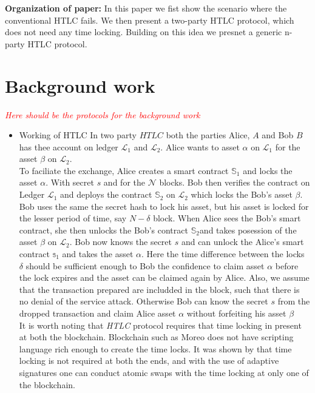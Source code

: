 \documentclass[manuscript,screen,review]{acmart}
\newcommand{\com}[1]{\textcolor{red}{\textit{#1}}}
\begin{document}
\textbf{Organization of paper:} In this paper we fist show the scenario where the conventional HTLC fails. We then present a two-party HTLC protocol, which does not need any time locking. Building on this idea we presnet a generic n-party HTLC protocol. 
\section{Background work}
\com{Here should be the protocols for the background work}
\begin{itemize}
	\item Working of HTLC
	In two party $HTLC$ both the parties Alice, $A$ and Bob $B$ has thee account on ledger $\mathcal{L}_1$ and $\mathcal{L}_2$. Alice wants to asset $\alpha$ on $\mathcal{L}_1$ for the asset $\beta$ on $\mathcal{L}_2$. \\
	To faciliate the exchange, Alice creates a smart contract $\mathbb{S}_1$ and locks the asset $\alpha$. With secret $s$ and for the $\mathcal{N}$ blocks. Bob then verifies the contract on Ledger $\mathcal{L}_1$ and deploys the contract $\mathbb{S}_2$ on $\mathcal{L}_2$ which locks the Bob's asset $\beta$. Bob uses the same the secret hash to lock his asset, but his asset is locked for the lesser period of time, say $N-\delta$ block. 
	When Alice sees the Bob's smart contract, she then unlocks the Bob's contract $\mathbb{S}_2$and takes posession of the asset $\beta$ on $\mathcal{L}_2$. Bob now knows the secret $s$ and can unlock the Alice's smart contract $\mathbb{s}_1$  and takes the asset $\alpha$. Here the time difference between the locks $\delta$ should be sufficient enough to Bob the confidence to claim asset $\alpha$ before the lock expires and the asset can be claimed again by Alice. Also, we assume that the transaction prepared are includded in the block, such that there is no denial of the service attack. Otherwise Bob can know the secret $s$ from the dropped transaction and claim Alice asset $\alpha$ without forfeiting his asset $\beta$ \\
	
	It is worth noting that \textit{HTLC} protocol requires that time locking in present at both the blockchain. Blockchain such as Moreo \cite{} does not have scripting language rich enough to create the time locks. It was shown by \cite{} that time locking is not required at both the ends, and with the use of adaptive signatures \cite{} one can conduct atomic swaps with the time locking at only one of the blockchain. 
	

\end{itemize}
\end{document}
